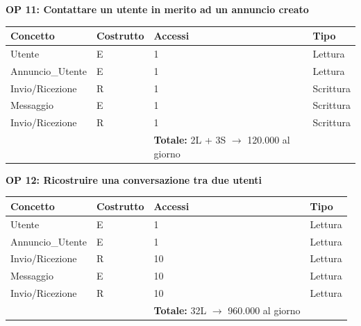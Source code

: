 \documentclass[a4paper,12pt]{report}
\begin{document}
            \newpage
            \noindent
            \textbf{OP 11: Contattare un utente in merito ad un annuncio creato}
        	\begin{table}[H]
            \centering
             \begin{tabular}{llll}
             \rowcolor{yellow!20} \textbf{Concetto} & \textbf{Costrutto} & \textbf{Accessi} & \textbf{Tipo}\\ [0.5ex] 
             \hline
             Utente & E & 1 & Lettura \\ 
             Annuncio\_Utente & E & 1 & Lettura \\ 
             Invio/Ricezione & R & 1 & Scrittura \\ 
             Messaggio & E & 1 & Scrittura \\ 
             Invio/Ricezione & R & 1 & Scrittura \\ 
             \hline
                \rowcolor{yellow!20} &   & \textbf{Totale:} 2L + 3S $\rightarrow$ 120.000 al giorno &  \\ [1ex] 
             
             \end{tabular}
            \end{table}

            \noindent
            \textbf{OP 12: Ricostruire una conversazione tra due utenti}
        	\begin{table}[H]
            \centering
             \begin{tabular}{llll}
             \rowcolor{yellow!20} \textbf{Concetto} & \textbf{Costrutto} & \textbf{Accessi} & \textbf{Tipo}\\ [0.5ex] 
             \hline
             Utente & E & 1 & Lettura \\ 
             Annuncio\_Utente & E & 1 & Lettura \\ 
             Invio/Ricezione & R & 10 & Lettura \\ 
             Messaggio & E & 10 & Lettura \\ 
             Invio/Ricezione & R & 10 & Lettura \\ 
             \hline
                \rowcolor{yellow!20} &   & \textbf{Totale:} 32L $\rightarrow$ 960.000 al giorno &  \\ [1ex] 
             
             \end{tabular}
            \end{table}
\end{document}
